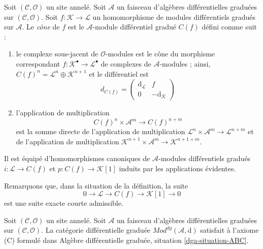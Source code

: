 \begin{definition}
\label{definition-cone}
Soit $(\mathcal{C}, \mathcal{O})$ un site annelé. Soit
$\mathcal{A}$ un faisceau d'algèbres différentielles graduées sur
$(\mathcal{C}, \mathcal{O})$. Soit
$f : \mathcal{K} \to \mathcal{L}$ un
homomorphisme de modules différentiels gradués sur $\mathcal{A}$. Le
{\it cône} de $f$ est le $\mathcal{A}$-module différentiel gradué
$C(f)$ défini comme suit :
\begin{enumerate}
\item le complexe sous-jacent de $\mathcal{O}$-modules est le cône
du morphisme correspondant
$f : \mathcal{K}^\bullet \to \mathcal{L}^\bullet$ de complexes de
$\mathcal{A}$-modules ; ainsi,
$C(f)^n = \mathcal{L}^n \oplus \mathcal{K}^{n + 1}$ et le différentiel
est
$$
d_{C(f)} =
\left(
\begin{matrix}
\text{d}_\mathcal{L} & f \\ 0 &
-\text{d}_\mathcal{K}
\end{matrix}
\right)
$$
\item l'application de multiplication
$$ C(f)^n
\times \mathcal{A}^m \to C(f)^{n + m}
$$ est la somme
directe de l'application de multiplication
$\mathcal{L}^n \times \mathcal{A}^m \to \mathcal{L}^{n + m}$ et
de l'application de multiplication
$\mathcal{K}^{n + 1} \times \mathcal{A}^m \to \mathcal{K}^{n + 1 + m}$.
\end{enumerate}
Il est équipé d'homomorphismes canoniques de
$\mathcal{A}$-modules différentiels gradués $i : \mathcal{L} \to C(f)$ et
$p : C(f) \to \mathcal{K}[1]$ induits par les applications évidentes.
\end{definition}

\noindent
Remarquons que, dans la situation de la définition, la suite
$$
0 \to \mathcal{L} \to C(f) \to \mathcal{K}[1] \to 0
$$
est une suite exacte courte admissible.

\begin{lemma}
\label{lemma-axiom-C}
Soit $(\mathcal{C}, \mathcal{O})$ un site annelé. Soit
$\mathcal{A}$ un faisceau d'algèbres différentielles graduées sur
$(\mathcal{C}, \mathcal{O})$. La
catégorie différentielle graduée
$\textit{Mod}^{dg}(\mathcal{A}, \text{d})$
satisfait à l'axiome (C) formulé dans
Algèbre différentielle graduée, situation \ref{dga-situation-ABC}.
\end{lemma}

